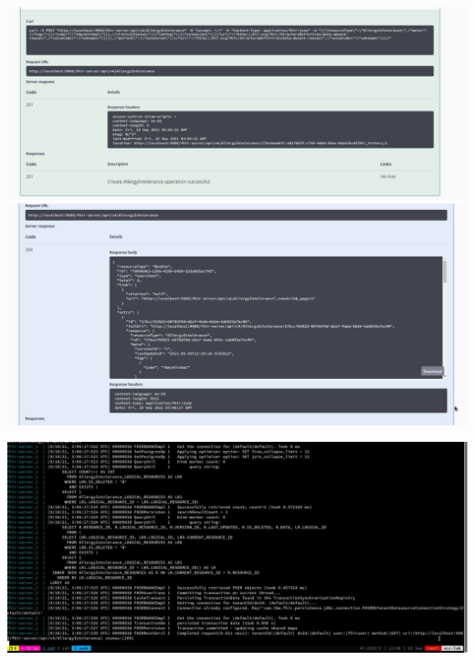 \documentclass{beamer}
\begin{document}
\begin{CJK*}{UTF8}{bsmi}
  \begin{frame}
    \includegraphics[width=\textwidth]{photo_2021-09-10_14-03-44.jpg}
    \includegraphics[width=\textwidth]{photo_2021-09-10_14-03-52.jpg}
  \end{frame}

  \begin{frame}
    \includegraphics[width=\textwidth]{photo_2021-09-10_14-04-10.jpg}
  \end{frame}


\end{CJK*}
\end{document}
